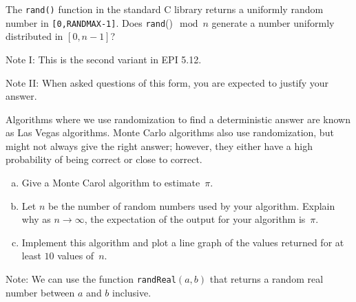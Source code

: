 \documentclass{article}
\begin{document}
\nextprob
The \texttt{rand()} function in the standard C library returns a
uniformly random number in \texttt{[0,RANDMAX-1]}. Does \texttt{rand}()$\mod n$
generate a number uniformly distributed in $[0,n-1]$?

Note I: This is the second variant in EPI 5.12.

Note II: When asked questions of this form, you are expected to justify your
answer.

\nextprob

Algorithms where we use randomization to find a deterministic answer are known
as Las Vegas algorithms.  Monte Carlo algorithms also use randomization, but
might not always give the right answer; however, they either have a high
probability of being correct or close to correct.

\begin{enumerate}[(a)]
    \item Give a Monte Carol algorithm to estimate~$\pi$.
    \item Let $n$ be the number of random numbers used by your algorithm.
        Explain why as $n \to \infty$, the expectation of the output for your
        algorithm is~$\pi$.
    \item Implement this algorithm and plot a line graph of
        the values returned for at least $10$ values of~$n$.
\end{enumerate}

Note: We can use the function \texttt{randReal}$(a,b)$ that returns a random
real number between $a$ and $b$ inclusive.
\end{document}
